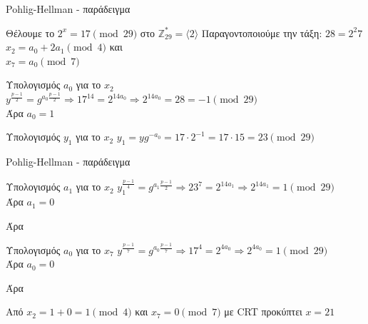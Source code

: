 \documentclass[handout]{beamer}
\begin{document}
\begin{frame}{Pohlig-Hellman - παράδειγμα}
\begin{block}{Θέλουμε το $2^x = 17 \pmod{29}$ στο $\mathbb{Z}_{29}^*=\langle 2 \rangle$}
Παραγοντοποιούμε την τάξη: $28=2^2 7$ \\
$x_2 = a_0 + 2a_1 \pmod{4}$ και \\ 
$x_7 = a_0 \pmod{7}$ \\
\end{block}

\pause
\begin{block}{Υπολογισμός $a_0$ για το $x_2$}
$y^\frac{p-1}{2} = g^{a_0 \frac{p-1}{2}} \Rightarrow 17^{14} = 2^{14 a_0} \Rightarrow  2^{14 a_0} = 28 = -1 \pmod{29}$ \\
Άρα $a_0=1$
\end{block}

\pause
\begin{block}{Υπολογισμός $y_1$ για το $x_2$}
$y_1 = y g^{-a_0} = 17 \cdot 2^{-1} = 17 \cdot 15 = 23 \pmod{29} $
\end{block}
\end{frame}

\begin{frame}{Pohlig-Hellman - παράδειγμα}
\begin{block}{Υπολογισμός $a_1$ για το $x_2$}
$y_1^\frac{p-1}{4} = g^{a_1 \frac{p-1}{2}} \Rightarrow 23^7  = 2^{14 a_1} \Rightarrow 2^{14 a_1} = 1 \pmod{29}$\\
Άρα $a_1=0$ \\
\end{block}
Άρα 
\pause
\begin{block}{Υπολογισμός $a_0$ για το $x_7$}
$y^\frac{p-1}{7} = g^{a_0 \frac{p-1}{7}} \Rightarrow 17^4 = 2^{4 a_0} \Rightarrow  2^{4 a_0} = 1 \pmod{29}$ \\
Άρα $a_0=0$
\end{block}
Άρα 

\pause
Από $x_2 = 1 + 0 = 1\pmod{4}$ και $x_7 = 0 \pmod{7}$ με CRT προκύπτει $x = 21$
 
\end{frame}
\end{document}
